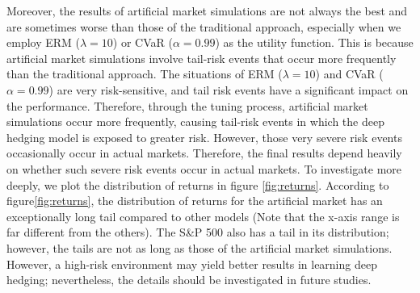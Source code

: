 Moreover, the results of artificial market simulations are not always the best and are sometimes worse than those of the traditional approach, especially when we employ ERM ($\lambda=10$) or CVaR ($\alpha=0.99$) as the utility function.
This is because artificial market simulations involve tail-risk events that occur more frequently than the traditional approach.
The situations of ERM ($\lambda=10$) and CVaR ($\alpha=0.99$) are very risk-sensitive, and tail risk events have a significant impact on the performance.
Therefore, through the tuning process, artificial market simulations occur more frequently, causing tail-risk events in which the deep hedging model is exposed to greater risk.
However, those very severe risk events occasionally occur in actual markets.
Therefore, the final results depend heavily on whether such severe risk events occur in actual markets.
To investigate more deeply, we plot the distribution of returns in figure \ref{fig:returns}.
According to figure\ref{fig:returns}, the distribution of returns for the artificial market has an exceptionally long tail compared to other models (Note that the x-axis range is far different from the others).
The S\&P 500 also has a tail in its distribution; however, the tails are not as long as those of the artificial market simulations.
However, a high-risk environment may yield better results in learning deep hedging; nevertheless, the details should be investigated in future studies.

